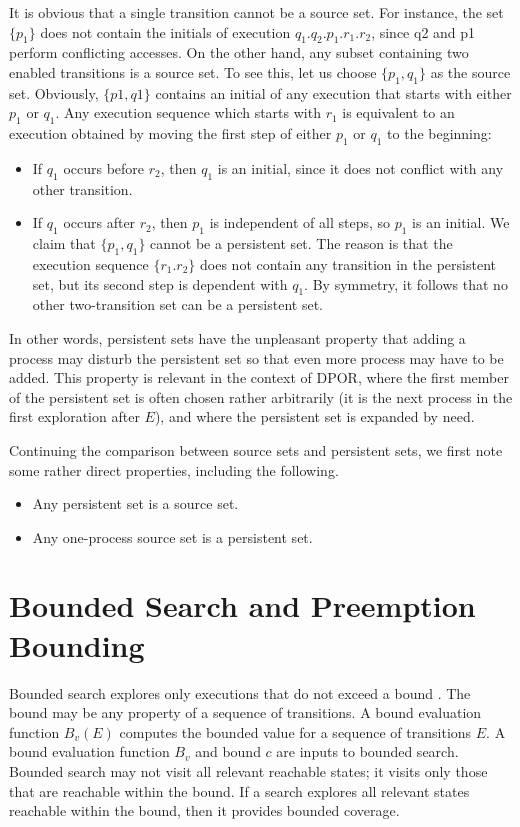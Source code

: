 It is obvious that a single transition cannot be a source set. For
instance, the set $\{ p_1 \}$ does not contain the initials of execution $q_1.q_2.p_1.r_1.r_2$,
since q2 and p1 perform conflicting accesses. On the other hand, any subset
containing two enabled transitions is a source set. To see this, let us choose
$\{p_1, q_1 \}$ as the source set. Obviously, $\{p1, q1 \}$ contains an initial of any execution
that starts with either $p_1$ or $q_1$. Any execution sequence which starts with $r_1$ is
equivalent to an execution obtained by moving the first step of either $p_1$ or $q_1$ to
the beginning:
\begin{itemize}
\item If $q_1$ occurs before $r_2$, then $q_1$ is an initial, since it does not conflict with
any other transition.
\item If $q_1$ occurs after $r_2$, then $p_1$ is independent of all steps, so $p_1$ is an initial.
We claim that $\{p_1, q_1 \}$ cannot be a persistent set. The reason is that the execution
sequence $\{r_1.r_2 \}$ does not contain any transition in the persistent set, but its second
step is dependent with $q_1$. By symmetry, it follows that no other two-transition
set can be a persistent set.
\end{itemize}

In other words, persistent sets have the unpleasant property that adding a process
may disturb the persistent set so that even more process may have to be added.
This property is relevant in the context of DPOR, where the first member of the
persistent set is often chosen rather arbitrarily (it is the next process in the first
exploration after $E$), and where the persistent set is expanded by need.

Continuing the comparison between source sets and persistent sets, we first
note some rather direct properties, including the following.

\begin{itemize}
\item Any persistent set is a source set.
\item Any one-process source set is a persistent set.
\end{itemize}


\section{Bounded Search and Preemption Bounding}

Bounded search explores only executions that do not exceed
a bound \cite{BPOR,Thomson}. The bound may be any property of a
sequence of transitions. A bound evaluation function $B_v(E)$
computes the bounded value for a sequence of transitions $E$.
A bound evaluation function $B_v$ and bound $c$ are inputs to
bounded search. Bounded search may not visit all relevant
reachable states; it visits only those that are reachable within
the bound. If a search explores all relevant states reachable
within the bound, then it provides bounded coverage.

